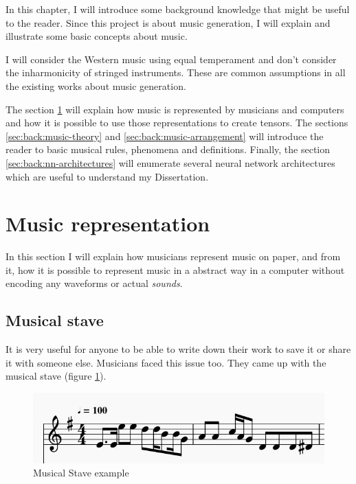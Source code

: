 \documentclass[12pt]{report}
\begin{document}
In this chapter, I will introduce some background knowledge that might be useful to the reader. Since this project is about music generation, I will explain and illustrate some basic concepts about music.

I will consider the Western music using equal temperament and don't consider the inharmonicity of stringed instruments. These are common assumptions in all the existing works about music generation.

The section \ref{sec:back:musical-representation} will explain how music is represented by musicians and computers and how it is possible to use those representations to create tensors.
The sections \ref{sec:back:music-theory} and \ref{sec:back:music-arrangement} will introduce the reader to basic musical rules, phenomena and definitions.
Finally, the section \ref{sec:back:nn-architectures} will enumerate several neural network architectures which are useful to understand my Dissertation.


\section{Music representation}
\label{sec:back:musical-representation}

In this section I will explain how musicians represent music on paper, and from it, how it is possible to represent music in a abstract way in a computer without encoding any waveforms or actual \textit{sounds}.

\subsection{Musical stave}

It is very useful for anyone to be able to write down their work to save it or share it with someone else. Musicians faced this issue too. They came up with the musical stave (figure \ref{fig:musical_stave_example}).

\begin{figure}[H]
    \centering
    \includegraphics[scale=0.75]{images/music/stave/musical_stave_example.jpg}
    \caption{Musical Stave example}
    \label{fig:musical_stave_example}
\end{figure}
\end{document}
